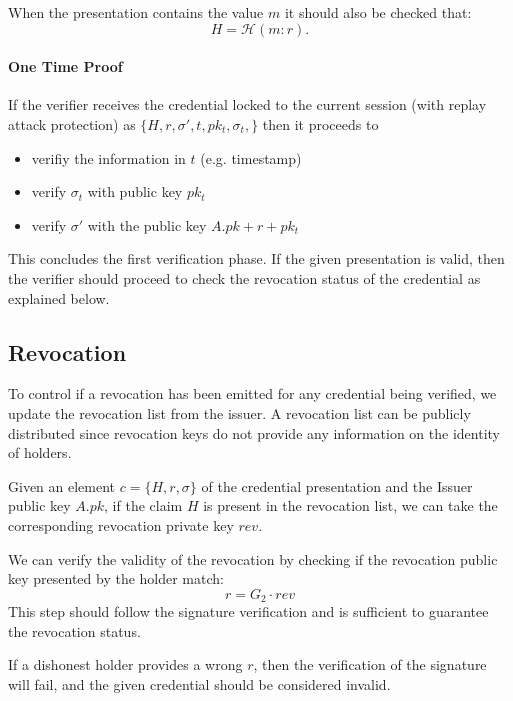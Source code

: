 When the presentation contains the value $m$ it should also be checked
that:
\begin{equation*}
    H = \mathcal{H}(m : r).
\end{equation*}


\paragraph{One Time Proof}

If the verifier receives the credential locked to the current session
(with replay attack protection) as $\{H, r, \sigma', t, pk_t,
\sigma_t,\}$ then it proceeds to
\begin{itemize}
\item verifiy the information in $t$ (e.g. timestamp)
\item verify $\sigma_t$ with public key $pk_t$
\item verify $\sigma'$ with the public key $A.pk + r + pk_t$
	\end{itemize}

This concludes the first verification phase. If the given presentation
is valid, then the verifier should proceed to check the revocation
status of the credential as explained below.

\subsection{Revocation}

To control if a revocation has been emitted for any credential being
verified, we update the revocation list from the issuer. A revocation
list can be publicly distributed since revocation keys do not provide
any information on the identity of holders.

Given an element $c = \{H, r, \sigma \}$ of the credential
presentation and the Issuer public key $A.pk$, if the claim $H$ is
present in the revocation list, we can take the corresponding
revocation private key $rev$.

We can verify the validity of the revocation by checking if the
revocation public key presented by the holder match:
\begin{equation*}
    r = G_2 \cdot rev
\end{equation*}
This step should follow the signature verification and is sufficient
to guarantee the revocation status.

If a dishonest holder provides a wrong $r$, then the verification of
the signature will fail, and the given credential should be considered
invalid.

